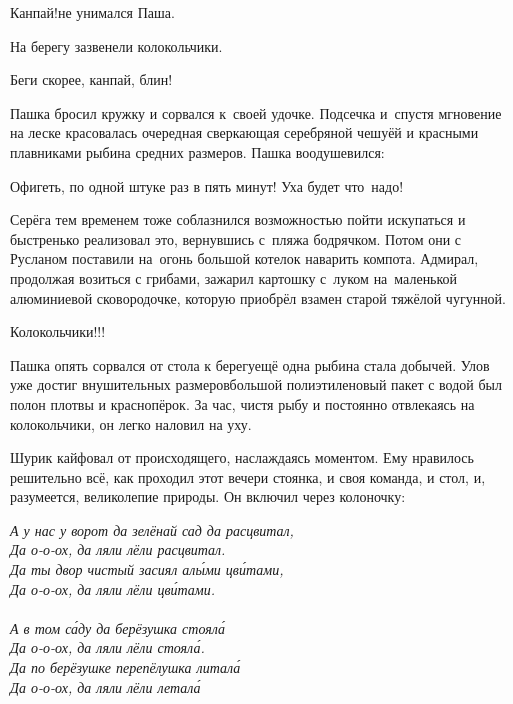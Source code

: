 \diagdash Канпай!\mdash не унимался Паша.

На берегу зазвенели колокольчики.

\diagdash Беги скорее, канпай, блин!

Пашка бросил кружку и сорвался к~своей удочке. Подсечка и~спустя мгновение на леске красовалась очередная сверкающая серебряной чешуёй и красными плавниками рыбина средних размеров. Пашка воодушевился:

\diagdash Офигеть, по одной штуке раз в пять минут! Уха будет что~надо!

Серёга тем временем тоже соблазнился возможностью пойти искупаться и быстренько реализовал это, вернувшись с~пляжа бодрячком. Потом они с Русланом поставили на~огонь большой котелок наварить компота. Адмирал, продолжая возиться с грибами, зажарил картошку с~луком на~маленькой алюминиевой сковородочке, которую приобрёл взамен старой тяжёлой чугунной. 

\diagdash Колокольчики!!!

Пашка опять сорвался от стола к берегу\mdash ещё одна рыбина стала добычей. Улов уже достиг внушительных размеров\mdash большой полиэтиленовый пакет с водой был полон плотвы и краснопёрок. За час, чистя рыбу и постоянно отвлекаясь на колокольчики, он легко наловил на уху.

Шурик кайфовал от происходящего, наслаждаясь моментом. Ему нравилось решительно всё, как проходил этот вечер\mdash и стоянка, и своя команда, и стол, и, разумеется, великолепие природы. Он включил через колоночку:

\vspace{0.2cm}
\noindent\textit{%
	\hspace*{1.5cm}А у нас у ворот да зелёнай сад да расцвитал,\\
	\hspace*{1.5cm}Да о-о-ох, да ляли лёли расцвитал.\\
	\hspace*{1.5cm}Да ты двор чистый засиял ал{\'ы}ми цв{\'и}тами,\\
	\hspace*{1.5cm}Да о-о-ох, да ляли лёли цв{\'и}тами.\\
	\\
	\hspace*{1.5cm}А в том с{\'а}ду да берёзушка стоял{\'а}\\
	\hspace*{1.5cm}Да о-о-ох, да ляли лёли стоял{\'а}.\\
	\hspace*{1.5cm}Да по берёзушке перепёлушка литал{\'а}\\
	\hspace*{1.5cm}Да о-о-ох, да ляли лёли летал{\'а}\myldots{}
}

